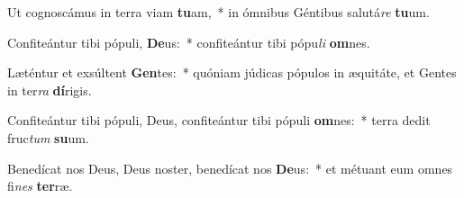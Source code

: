\item Ut cognoscámus in terra viam \textbf{tu}am,~* in ómnibus Géntibus salutá\textit{re} \textbf{tu}um.
\item Confiteántur tibi pópuli, \textbf{De}us:~* confiteántur tibi pópu\textit{li} \textbf{om}nes.
\item Læténtur et exsúltent \textbf{Gen}tes:~* quóniam júdicas pópulos in æquitáte, et Gentes in ter\textit{ra} \textbf{dí}rigis.
\item Confiteántur tibi pópuli, Deus, confiteántur tibi pópuli \textbf{om}nes:~* terra dedit fruc\textit{tum} \textbf{su}um.
\item Benedícat nos Deus, Deus noster, benedícat nos \textbf{De}us:~* et métuant eum omnes fi\textit{nes} \textbf{ter}ræ.
